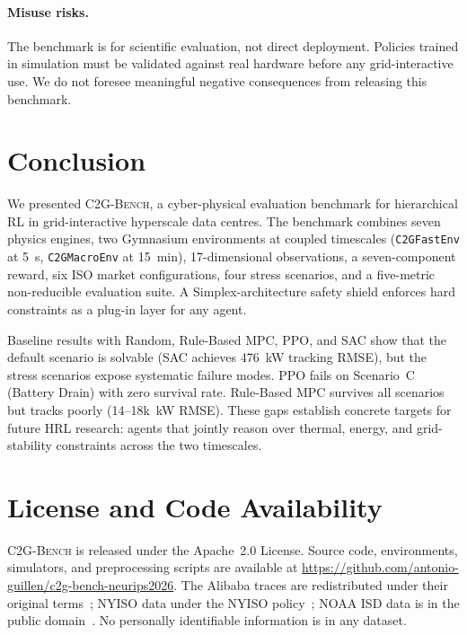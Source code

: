 \documentclass{article}
\newcommand{\cname}{\textsc{C2G-Bench}}
\newcommand{\envlow}{\texttt{C2GFastEnv}}
\newcommand{\envhigh}{\texttt{C2GMacroEnv}}
\begin{document}
\paragraph{Misuse risks.}
The benchmark is for scientific evaluation, not direct deployment.
Policies trained in simulation must be validated against real hardware
before any grid-interactive use.
We do not foresee meaningful negative consequences from releasing this
benchmark.

\section{Conclusion}
\label{sec:conclusion}

We presented \cname{}, a cyber-physical evaluation benchmark for hierarchical
RL in grid-interactive hyperscale data centres.
The benchmark combines seven physics engines, two Gymnasium environments at
coupled timescales (\envlow{} at 5~s, \envhigh{} at 15~min),
17-dimensional observations, a seven-component reward, six ISO market
configurations, four stress scenarios, and a five-metric non-reducible
evaluation suite.
A Simplex-architecture safety shield enforces hard constraints as a plug-in
layer for any agent.

Baseline results with Random, Rule-Based MPC, PPO, and SAC show that the
default scenario is solvable (SAC achieves 476~kW tracking RMSE), but the
stress scenarios expose systematic failure modes.
PPO fails on Scenario~C (Battery Drain) with zero survival rate.
Rule-Based MPC survives all scenarios but tracks poorly (14--18k~kW RMSE).
These gaps establish concrete targets for future HRL research: agents that
jointly reason over thermal, energy, and grid-stability constraints across
the two timescales.

\section*{License and Code Availability}
\label{sec:license}

\cname{} is released under the Apache~2.0 License.
Source code, environments, simulators, and preprocessing scripts are available
at \url{https://github.com/antonio-guillen/c2g-bench-neurips2026}.
The Alibaba traces are redistributed under their original
terms~\citep{alibaba2023cluster};
NYISO data under the NYISO policy~\citep{nyiso2024lmp};
NOAA ISD data is in the public domain~\citep{noaa2024isd}.
No personally identifiable information is in any dataset.



\end{document}
